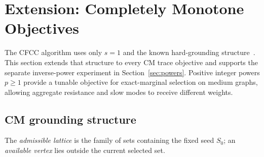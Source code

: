 \section{Extension: Completely Monotone Objectives}\label{sec:extensions}
The CFCC algorithm uses only $s=1$ and the known hard-grounding
structure~\cite{li2019}. This section extends that structure to every
CM trace objective and supports the separate inverse-power experiment
in Section~\ref{sec:powers}. Positive integer powers $p\geq1$ provide
a tunable objective for exact-marginal selection on medium graphs,
allowing aggregate resistance and slow modes to receive different weights.

\subsection{CM grounding structure}\label{sec:structure}
The \emph{admissible lattice} is the family of sets containing the
fixed seed $S_0$; an \emph{available vertex} lies outside the
current selected set.


